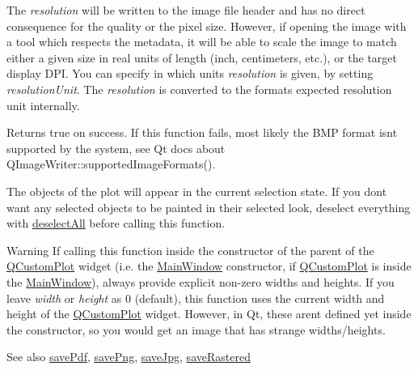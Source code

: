 The {\itshape resolution} will be written to the image file header and has no direct consequence for the quality or the pixel size. However, if opening the image with a tool which respects the metadata, it will be able to scale the image to match either a given size in real units of length (inch, centimeters, etc.), or the target display D\+PI. You can specify in which units {\itshape resolution} is given, by setting {\itshape resolution\+Unit}. The {\itshape resolution} is converted to the format\textquotesingle{}s expected resolution unit internally.

Returns true on success. If this function fails, most likely the B\+MP format isn\textquotesingle{}t supported by the system, see Qt docs about Q\+Image\+Writer\+::supported\+Image\+Formats().

The objects of the plot will appear in the current selection state. If you don\textquotesingle{}t want any selected objects to be painted in their selected look, deselect everything with \mbox{\hyperlink{class_q_custom_plot_a9d4808ab925b003054085246c92a257c}{deselect\+All}} before calling this function.

\begin{DoxyWarning}{Warning}
If calling this function inside the constructor of the parent of the \mbox{\hyperlink{class_q_custom_plot}{Q\+Custom\+Plot}} widget (i.\+e. the \mbox{\hyperlink{class_main_window}{Main\+Window}} constructor, if \mbox{\hyperlink{class_q_custom_plot}{Q\+Custom\+Plot}} is inside the \mbox{\hyperlink{class_main_window}{Main\+Window}}), always provide explicit non-\/zero widths and heights. If you leave {\itshape width} or {\itshape height} as 0 (default), this function uses the current width and height of the \mbox{\hyperlink{class_q_custom_plot}{Q\+Custom\+Plot}} widget. However, in Qt, these aren\textquotesingle{}t defined yet inside the constructor, so you would get an image that has strange widths/heights.
\end{DoxyWarning}
\begin{DoxySeeAlso}{See also}
\mbox{\hyperlink{class_q_custom_plot_ad5acd34f6b39c3516887d7e54fec2412}{save\+Pdf}}, \mbox{\hyperlink{class_q_custom_plot_ac92cc9256d12f354b40a4be4600b5fb9}{save\+Png}}, \mbox{\hyperlink{class_q_custom_plot_a76f0d278e630a711fa6f48048cfd83e4}{save\+Jpg}}, \mbox{\hyperlink{class_q_custom_plot_ad7723ce2edfa270632ef42b03a444352}{save\+Rastered}} 
\end{DoxySeeAlso}
\mbox{\label{class_q_custom_plot_a76f0d278e630a711fa6f48048cfd83e4}} 
